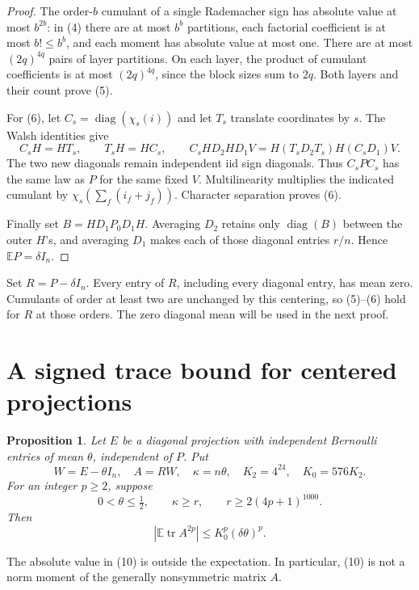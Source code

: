 \documentclass[11pt]{article}
\newtheorem{proposition}[theorem]{Proposition}
\theoremstyle{definition}
\newcommand{\E}{\mathbb E}
\DeclareMathOperator{\tr}{tr}
\DeclareMathOperator{\diag}{diag}
\begin{document}
\begin{proof}
The order-\(b\) cumulant of a single Rademacher sign has absolute value
at most \(b^{2b}\): in (4) there are at most \(b^b\) partitions, each
factorial coefficient is at most \(b!\le b^b\), and each moment has
absolute value at most one. There are at most \((2q)^{4q}\) pairs of
layer partitions. On each layer, the product of cumulant coefficients
is at most \((2q)^{4q}\), since the block sizes sum to \(2q\).
Both layers and their count prove (5).

For (6), let \(C_s=\diag(\chi_s(i))\) and let \(T_s\) translate
coordinates by \(s\). The Walsh identities give
\[
 C_sH=HT_s,\qquad T_sH=HC_s,\qquad
 C_sHD_2HD_1V=H(T_sD_2T_s)H(C_sD_1)V.                           \tag{8}
\]
The two new diagonals remain independent iid sign diagonals. Thus
\(C_sPC_s\) has the same law as \(P\) for the same fixed \(V\).
Multilinearity multiplies the indicated cumulant by
\(\chi_s(\sum_f(i_f+j_f))\). Character separation proves (6).

Finally set \(B=HD_1P_0D_1H\). Averaging \(D_2\) retains only
\(\diag(B)\) between the outer \(H\)'s, and averaging \(D_1\) makes
each of those diagonal entries \(r/n\). Hence \(\E P=\delta I_n\).
\end{proof}

Set \(R=P-\delta I_n\). Every entry of \(R\), including every diagonal
entry, has mean zero. Cumulants of order at least two are unchanged
by this centering, so (5)--(6) hold for \(R\) at those orders.
The zero diagonal mean will be used in the next proof.

\section{A signed trace bound for centered projections}

\begin{proposition}\label{prop:trace}
Let \(E\) be a diagonal projection with independent Bernoulli entries
of mean \(\theta\), independent of \(P\). Put
\[
 W=E-\theta I_n,\quad A=RW,\quad \kappa=n\theta,\quad
 K_2=4^{24},\quad K_0=576K_2.
\]
For an integer \(p\ge2\), suppose
\[
 0<\theta\le\tfrac12,\qquad \kappa\ge r,\qquad
                         r\ge2(4p+1)^{1000}.                    \tag{9}
\]
Then
\[
                  \left|\E\tr A^{2p}\right|
                           \le K_0^p(\delta\theta)^p.            \tag{10}
\]
\end{proposition}

The absolute value in (10) is outside the expectation. In particular,
(10) is not a norm moment of the generally nonsymmetric matrix \(A\).
\end{document}
